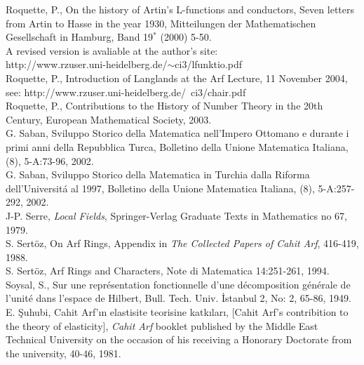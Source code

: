 \documentclass[12pt]{amsart}
\begin{document}
\begin{thebibliography}{10}
 Roquette, P., On the history of Artin's L-functions and conductors, Seven letters from Artin to Hasse in the year 1930, Mitteilungen der Mathematischen Gesellschaft in Hamburg, Band  19$^\ast$ (2000) 5-50. \\
A revised version is avaliable at the author's site: \\
http://www.rzuser.uni-heidelberg.de/$\sim$ci3/lfunktio.pdf\\

 Roquette, P., Introduction of Langlands at the Arf Lecture, 11 November 2004, \\
    see: http://www.rzuser.uni-heidelberg.de/~ci3/chair.pdf \\

 Roquette, P., Contributions to the History of Number Theory in the 20th Century, European Mathematical Society, 2003. \\

 G. Saban, Sviluppo Storico della Matematica nell'Impero Ottomano e durante i primi anni della Repubblica Turca, Bolletino della Unione Matematica Italiana, (8), 5-A:73-96, 2002. \\

 G. Saban, Sviluppo Storico della Matematica in Turchia dalla Riforma dell'Universit\'{a} al 1997, Bolletino della Unione Matematica Italiana, (8), 5-A:257-292, 2002. \\

 J-P. Serre, {\it Local Fields}, Springer-Verlag Graduate Texts in Mathematics no 67, 1979. \\

 S. Sert\"{o}z, On Arf Rings,
Appendix in {\it The Collected Papers of Cahit Arf}, 416-419, 1988. \\

 S. Sert\"{o}z, Arf Rings and Characters,
Note di Matematica 14:251-261, 1994.\\

Soysal, S., Sur une repr\'{e}sentation fonctionnelle d'une d\'{e}composition g\'{e}n\'{e}rale de l'unit\'{e} dans l'espace de Hilbert, Bull. Tech. Univ. {\.I}stanbul 2, No: 2, 65-86, 1949.\\

 E. \c{S}uhubi, Cahit Arf'{\i}n elastisite teorisine katk{\i}lar{\i}, [Cahit Arf's contribition to the theory of elasticity], \emph{Cahit Arf} booklet published by the Middle East Technical University on the occasion of his receiving a Honorary Doctorate from the university, 40-46, 1981. \\


\end{thebibliography}
\end{document}
